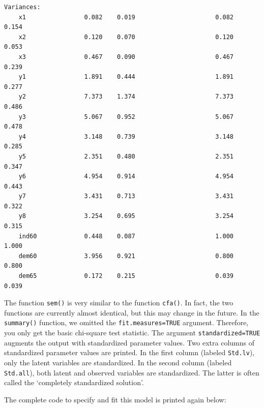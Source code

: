 \begin{verbatim}
Variances:
    x1                0.082    0.019                      0.082    0.154
    x2                0.120    0.070                      0.120    0.053
    x3                0.467    0.090                      0.467    0.239
    y1                1.891    0.444                      1.891    0.277
    y2                7.373    1.374                      7.373    0.486
    y3                5.067    0.952                      5.067    0.478
    y4                3.148    0.739                      3.148    0.285
    y5                2.351    0.480                      2.351    0.347
    y6                4.954    0.914                      4.954    0.443
    y7                3.431    0.713                      3.431    0.322
    y8                3.254    0.695                      3.254    0.315
    ind60             0.448    0.087                      1.000    1.000
    dem60             3.956    0.921                      0.800    0.800
    dem65             0.172    0.215                      0.039    0.039
\end{verbatim}

The function \texttt{sem()} is very similar to the function
\texttt{cfa()}. In fact, the two functions are currently almost
identical, but this may change in the future. In the \texttt{summary()}
function, we omitted the \texttt{fit.measures=TRUE} argument. Therefore,
you only get the basic chi-square test statistic. The argument
\texttt{standardized=TRUE} augments the output with standardized
parameter values. Two extra columns of standardized parameter values are
printed. In the first column (labeled \texttt{Std.lv}), only the latent
variables are standardized. In the second column (labeled
\texttt{Std.all}), both latent and observed variables are standardized.
The latter is often called the `completely standardized solution'.

The complete code to specify and fit this model is printed again below:

\begin{Shaded}
\begin{Highlighting}[]
\StringTok{ }
\NormalTok{)}
\end{Highlighting}
\end{Shaded}

